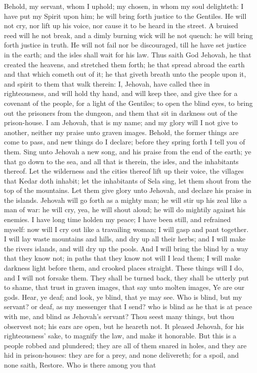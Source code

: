 Behold, my servant, whom I uphold; my chosen, in whom my soul delighteth: I have put my Spirit upon him; he will bring forth justice to the Gentiles. He will not cry, nor lift up his voice, nor cause it to be heard in the street. A bruised reed will he not break, and a dimly burning wick will he not quench: he will bring forth justice in truth. He will not fail nor be discouraged, till he have set justice in the earth; and the isles shall wait for his law.  Thus saith God Jehovah, he that created the heavens, and stretched them forth; he that spread abroad the earth and that which cometh out of it; he that giveth breath unto the people upon it, and spirit to them that walk therein: I, Jehovah, have called thee in righteousness, and will hold thy hand, and will keep thee, and give thee for a covenant of the people, for a light of the Gentiles; to open the blind eyes, to bring out the prisoners from the dungeon, and them that sit in darkness out of the prison-house. I am Jehovah, that is my name; and my glory will I not give to another, neither my praise unto graven images. Behold, the former things are come to pass, and new things do I declare; before they spring forth I tell you of them.  Sing unto Jehovah a new song, and his praise from the end of the earth; ye that go down to the sea, and all that is therein, the isles, and the inhabitants thereof. Let the wilderness and the cities thereof lift up their voice, the villages that Kedar doth inhabit; let the inhabitants of Sela sing, let them shout from the top of the mountains. Let them give glory unto Jehovah, and declare his praise in the islands. Jehovah will go forth as a mighty man; he will stir up his zeal like a man of war: he will cry, yea, he will shout aloud; he will do mightily against his enemies.  I have long time holden my peace; I have been still, and refrained myself: now will I cry out like a travailing woman; I will gasp and pant together. I will lay waste mountains and hills, and dry up all their herbs; and I will make the rivers islands, and will dry up the pools. And I will bring the blind by a way that they know not; in paths that they know not will I lead them; I will make darkness light before them, and crooked places straight. These things will I do, and I will not forsake them. They shall be turned back, they shall be utterly put to shame, that trust in graven images, that say unto molten images, Ye are our gods.  Hear, ye deaf; and look, ye blind, that ye may see. Who is blind, but my servant? or deaf, as my messenger that I send? who is blind as he that is at peace with me, and blind as Jehovah’s servant? Thou seest many things, but thou observest not; his ears are open, but he heareth not. It pleased Jehovah, for his righteousness’ sake, to magnify the law, and make it honorable. But this is a people robbed and plundered; they are all of them snared in holes, and they are hid in prison-houses: they are for a prey, and none delivereth; for a spoil, and none saith, Restore.  Who is there among you that 